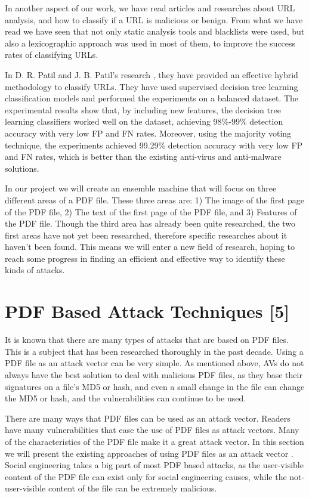 \documentclass{article}
\begin{document}
\indent In another aspect of our work, we have read articles and researches about URL analysis, and how to classify if a URL is malicious or benign. From what we have read we have seen that not only static analysis tools and blacklists were used, but also a lexicographic approach was used in most of them, to improve the success rates of classifying URLs. 

\clearpage
\newpage

\indent In D. R. Patil and J. B. Patil’s research \cite{patil2018malicious}, they have provided an effective hybrid methodology to classify URLs. They have used supervised decision tree learning classification models and performed the experiments on a balanced dataset. The experimental results show that, by including new features, the decision tree learning classifiers worked well on the dataset, achieving 98\%-99\% detection accuracy with very low FP and FN rates. Moreover, using the majority voting technique, the experiments achieved 99.29\% detection accuracy with very low FP and FN rates, which is better than the existing anti-virus and anti-malware solutions.

\indent In our project we will create an ensemble machine that will focus on three different areas of a PDF file. These three areas are: 1) The image of the first page of the PDF file, 2) The text of the first page of the PDF file, and 3) Features of the PDF file. Though the third area has already been quite researched, the two first areas have not yet been researched, therefore specific researches about it haven't been found. This means we will enter a new field of research, hoping to reach some progress in finding an efficient and effective way to identify these kinds of attacks. 

\section{PDF Based Attack Techniques [5]}
\indent	It is known that there are many types of attacks that are based on PDF files. This is a subject that has been researched thoroughly in the past decade. Using a PDF file as an attack vector can be very simple. As mentioned above, AVs do not always have the best solution to deal with malicious PDF files, as they base their signatures on a file’s MD5 or hash, and even a small change in the file can change the MD5 or hash, and the vulnerabilities can continue to be used.

\indent There are many ways that PDF files can be used as an attack vector. Readers have many vulnerabilities that ease the use of PDF files as attack vectors. Many of the characteristics of the PDF file make it a great attack vector. In this section we will present the existing approaches of using PDF files as an attack vector \cite{BGU2014malicious}. Social engineering takes a big part of most PDF based attacks, as the user-visible content of the PDF file can exist only for social engineering causes, while the not-user-visible content of the file can be extremely malicious.
\end{document}
